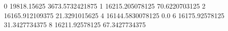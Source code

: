 0 19818.15625 3673.5732421875
1 16215.205078125 70.6220703125
2 16165.912109375 21.3291015625
4 16144.5830078125 0.0
6 16175.92578125 31.3427734375
8 16211.92578125 67.3427734375
